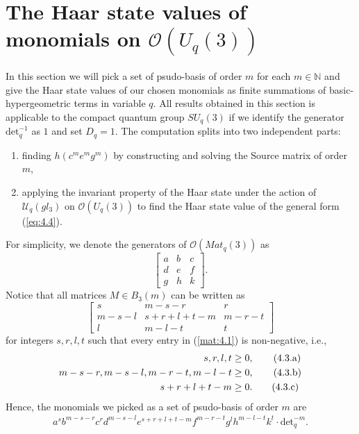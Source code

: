\documentclass[table,a4paper,reqno]{amsart}
\numberwithin{equation}{section}
\theoremstyle{definition}
\begin{document}
\section{The Haar state values of monomials on $\mathcal{O}(U_q(3))$}
In this section we will pick a set of psudo-basis of order $m$ for each $m\in\mathbb{N}$ and give the Haar state values of our chosen monomials as finite summations of basic-hypergeometric terms in variable $q$. All results obtained in this section is applicable to the compact quantum group $SU_q(3)$ if we identify the generator $\text{det}_q^{-1}$ as $1$ and set $D_q=1$. The computation splits into two independent parts:
\begin{enumerate}
    \item[1)] finding $h(c^me^mg^m)$ by constructing and solving the Source matrix of order $m$,
    \item[2)] applying the invariant property of the Haar state under the action of $\mathcal{U}_q(gl_3)$ on $\mathcal{O}(U_q(3))$ to find the Haar state value of the general form (\ref{eq:4.4}).
\end{enumerate}
For simplicity, we denote the generators of $\mathcal{O}(Mat_q(3))$ as
\begin{equation}\label{mat:generator_3}
    \begin{bmatrix}
    a&b&c\\
    d&e&f\\  
    g&h&k
    \end{bmatrix}.
\end{equation}
Notice that all matrices $M\in B_3(m)$ can be written as
\begin{equation}\label{mat:4.1}
    \begin{bmatrix}
    s&m-s-r&r\\
    m-s-l&s+r+l+t-m&m-r-t\\  
    l&m-l-t&t
    \end{bmatrix}
\end{equation}
for integers $s,r,l,t$ such that every entry in (\ref{mat:4.1}) is non-negative, i.e.,
\begin{align}\stepcounter{equation}
    s,r,l,t&\ge 0, \tag{4.3.a}\label{eq:4.3.a}\\
    m-s-r,m-s-l,m-r-t,m-l-t&\ge 0,\tag{4.3.b}\label{eq:4.3.b}\\
    s+r+l+t-m&\ge 0.\tag{4.3.c}\label{eq:4.3.c}
\end{align}
Hence, the monomials we picked as a set of psudo-basis of order $m$ are
\begin{align}\label{eq:4.4}
    a^sb^{m-s-r}c^rd^{m-s-l}e^{s+r+l+t-m}f^{m-r-t}g^lh^{m-l-t}k^t\cdot\text{det}_q^{-m}.
\end{align}
\end{document}
